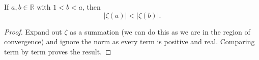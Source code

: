 \begin{theorem}
\label{norm_zeta_strict_mono_ofReal}
\leanok
If $a,b\in\mathbb{R}$ with $1<b<a$, then
    $$|\zeta(a)|<|\zeta(b)|.$$
\end{theorem}
\begin{proof}
\leanok
Expand out $\zeta$ as a summation (we can do this as we are in the region of convergence) and
    ignore the norm as every term is positive and real. Comparing term by term proves the result.
\end{proof}
